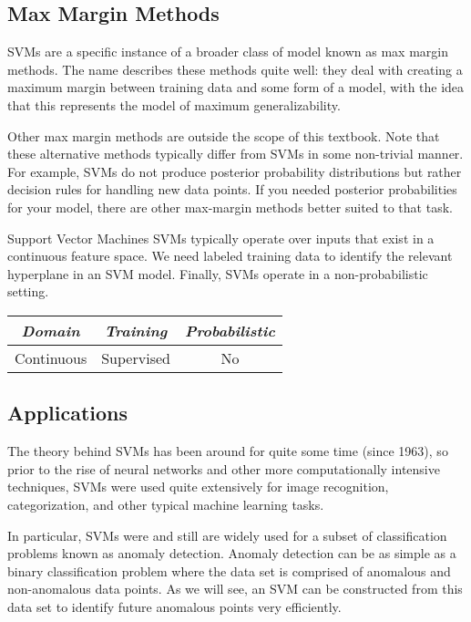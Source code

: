 \subsection{Max Margin Methods}
SVMs are a specific instance of a broader class of model known as max margin methods. The name describes these methods quite well: they deal with creating a maximum margin between training data and some form of a model, with the idea that this represents the model of maximum generalizability. 

Other max margin methods are outside the scope of this textbook. Note that these alternative methods typically differ from SVMs in some non-trivial manner. For example, SVMs do not produce posterior probability distributions but rather decision rules for handling new data points. If you needed posterior probabilities for your model, there are other max-margin methods better suited to that task.

\begin{mlcube}{Support Vector Machines}
SVMs typically operate over inputs that exist in a continuous feature space. We need labeled training data to identify the relevant hyperplane in an SVM model. Finally, SVMs operate in a non-probabilistic setting.
\begin{center}
    \begin{tabular}{c|c|c}
    \textit{\textbf{Domain}} & \textit{\textbf{Training}} & \textit{\textbf{Probabilistic}} \\
    \hline
    Continuous & Supervised & No \\
    \end{tabular}
\end{center}
\end{mlcube}

\subsection{Applications}
The theory behind SVMs has been around for quite some time (since 1963), so prior to the rise of neural networks and other more computationally intensive techniques, SVMs were used quite extensively for image recognition, categorization, and other typical machine learning tasks.

In particular, SVMs were and still are widely used for a subset of classification problems known as anomaly detection.
Anomaly detection can be as simple as a binary classification problem where the data set is comprised of anomalous and non-anomalous data points. As we will see, an SVM can be constructed from this data set to identify future anomalous points very efficiently.

